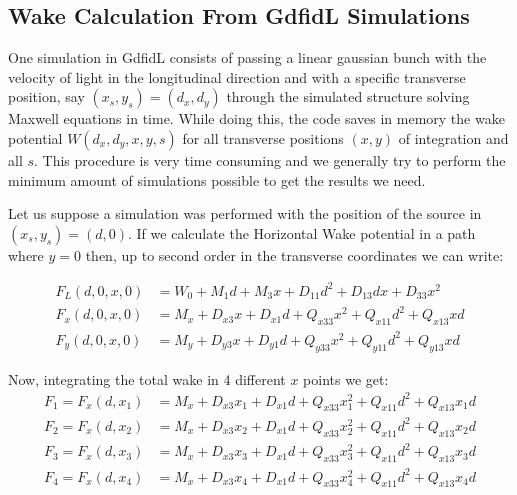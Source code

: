\begin{apendicesenv}
\chapter{Wake Calculation From GdfidL Simulations} \label{app:wake_from_gdfidl}

    One simulation in GdfidL consists of passing a linear gaussian bunch with the velocity of light in the longitudinal direction and with a specific transverse position, say $(x_s,y_s)=(d_x,d_y)$ through the simulated structure solving Maxwell equations in time. While doing this, the code saves in memory the wake potential $W(d_x,d_y,x,y,s)$ for all transverse positions $(x,y)$ of integration and all $s$. This procedure is very time consuming and we generally try to perform the minimum amount of simulations possible to get the results we need.

    Let us suppose a simulation was performed with the position of the source in $(x_s,y_s)=(d,0)$. If we calculate the Horizontal Wake potential in a path where $y=0$ then, up to second order in the transverse coordinates we can write:

    \begin{align}
		F_L(d,0,x,0) &= W_0  +  M_1d  +  M_3x + D_{11}d^2 + D_{13}dx + D_{33}x^2 \\
		F_x(d,0,x,0) &= M_x + D_{x3} x + D_{x1} d + Q_{x33} x^2 + Q_{x11} d^2 + Q_{x13} x d\\
		F_y(d,0,x,0) &= M_y + D_{y3} x + D_{y1} d + Q_{y33} x^2 + Q_{y11} d^2 + Q_{y13} x d
    \end{align}

    Now, integrating the total wake in 4 different $x$ points we get:
    \begin{align}
		F_1 = F_x(d,x_1) &= M_x  +  D_{x3} x_1  +  D_{x1} d  +  Q_{x33} x_1^2  +  Q_{x11} d^2  +  Q_{x13} x_1 d \\
    	F_2 = F_x(d,x_2) &= M_x  +  D_{x3} x_2  +  D_{x1} d  +  Q_{x33} x_2^2  +  Q_{x11} d^2  +  Q_{x13} x_2 d \\
    	F_3 = F_x(d,x_3) &= M_x  +  D_{x3} x_3  +  D_{x1} d  +  Q_{x33} x_3^2  +  Q_{x11} d^2  +  Q_{x13} x_3 d \\
    	F_4 = F_x(d,x_4) &= M_x  +  D_{x3} x_4  +  D_{x1} d  +  Q_{x33} x_4^2  +  Q_{x11} d^2  +  Q_{x13} x_4 d
    \end{align}


\end{apendicesenv}
